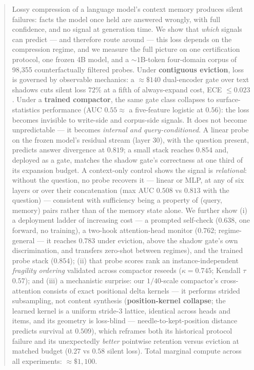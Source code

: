\documentclass[11pt]{article}
\begin{document}
\begin{abstract}
Lossy compression of a language model's context memory produces silent
failures: facts the model once held are answered wrongly, with full
confidence, and no signal at generation time. We show that \emph{which}
signals can predict --- and therefore route around --- this loss depends on
the compression regime, and we measure the full picture on one
certification protocol, one frozen 4B model, and a ${\sim}1$B-token
four-domain corpus of 98{,}355 counterfactually filtered probes. Under
\textbf{contiguous eviction}, loss is governed by observable mechanics: a
${\approx}\$140$ dual-encoder gate over text shadows cuts silent loss $72\%$
at a fifth of always-expand cost, ECE $\leq 0.023$. Under a \textbf{trained
compactor}, the same gate class collapses to surface-statistics performance
(AUC $0.55 \approx$ a five-feature logistic at $0.56$): the loss becomes
invisible to write-side and corpus-side signals. It does not become
unpredictable --- it becomes \emph{internal and query-conditioned}. A linear
probe on the frozen model's residual stream (layer 30), with the question
present, predicts answer divergence at $0.819$; a small stack reaches
$0.854$ and, deployed as a gate, matches the shadow gate's correctness at
one third of its expansion budget. A context-only control shows the signal
is \emph{relational}: without the question, no probe recovers it --- linear
or MLP, at any of six layers or over their concatenation (max AUC $0.508$ vs
$0.813$ with the question) --- consistent with sufficiency being a property
of (query, memory) pairs rather than of the memory state alone. We further
show (i) a deployment ladder of increasing cost --- a prompted self-check
($0.638$, one forward, no training), a two-hook attention-head monitor
($0.762$; regime-general --- it reaches $0.783$ under eviction, above the
shadow gate's own discrimination, and transfers zero-shot between regimes),
and the trained probe stack ($0.854$); (ii) that probe
scores rank an instance-independent \emph{fragility ordering} validated
across compactor reseeds ($\kappa{=}0.745$; Kendall $\tau$ $0.57$); and
(iii) a mechanistic surprise: our $1/40$-scale compactor's cross-attention
consists of exact positional delta kernels --- it performs strided
subsampling, not content synthesis (\textbf{position-kernel collapse}; the
learned kernel is a uniform stride-$3$ lattice, identical across heads and
items, and its geometry is loss-blind --- needle-to-kept-position distance
predicts survival at $0.509$), which reframes both its historical protocol failure
and its unexpectedly \emph{better} pointwise retention versus eviction at
matched budget ($0.27$ vs $0.58$ silent loss). Total marginal compute across
all experiments: ${\approx}\$1{,}100$.
\end{abstract}
\end{document}
